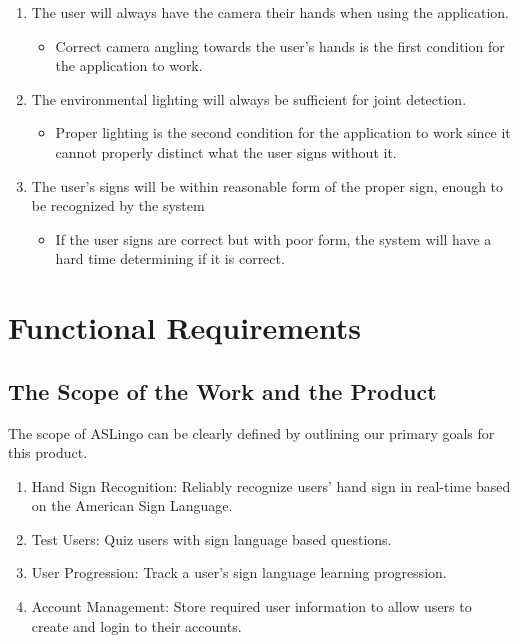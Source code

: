 \documentclass[12pt, titlepage]{article}
\begin{document}
\begin{enumerate}
    \item The user will always have the camera their hands when using the application.
    \begin{itemize}
        \item[] Correct camera angling towards the user's hands is the first condition for the application to work.
    \end{itemize}
    \item The environmental lighting will always be sufficient for joint detection.
    \begin{itemize}
        \item[] Proper lighting is the second condition for the application to work since it cannot properly distinct what the user signs without it.
    \end{itemize}
    \item The user's signs will be within reasonable form of the proper sign, enough to be recognized by the system
    \begin{itemize}
        \item[] If the user signs are correct but with poor form, the system will have a hard time determining if it is correct.
    \end{itemize}
\end{enumerate}



\section{Functional Requirements}

\subsection{The Scope of the Work and the Product}
The scope of ASLingo can be clearly defined by outlining our primary goals for this product.

\begin{enumerate}
  \item Hand Sign Recognition: Reliably recognize users' hand sign in real-time based on the American Sign Language.
  \item Test Users: Quiz users with sign language based questions.
  \item User Progression: Track a user's sign language learning progression.
  \item Account Management: Store required user information to allow users to create and login to their accounts.
\end{enumerate}
\end{document}
